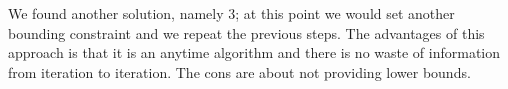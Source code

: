\documentclass[10pt,a4paper]{article}
\begin{document}
We found another solution, namely 3; at this point we would set another bounding
constraint and we repeat the previous steps. The advantages of this approach is
that it is an anytime algorithm and there is no waste of information from
iteration to iteration. The cons are about not providing lower bounds.
\end{document}
